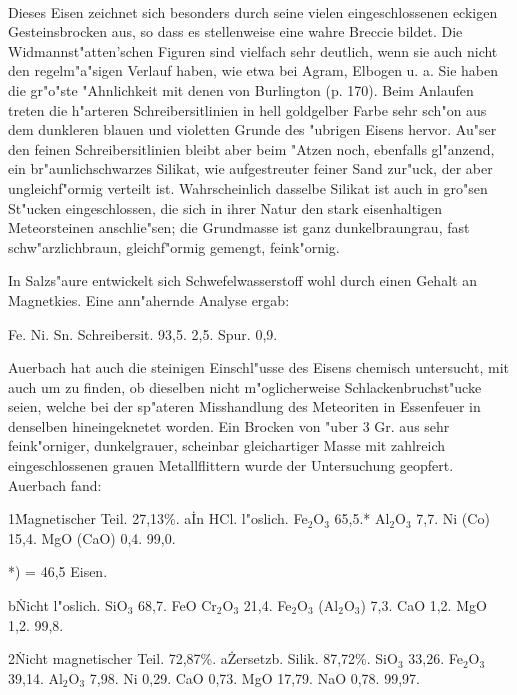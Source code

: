 \documentclass[a4paper, 11pt, oneside]{article}
\begin{document}
\paragraph{}
Dieses Eisen zeichnet sich besonders durch seine vielen eingeschlossenen eckigen Gesteinsbrocken aus, so dass es stellenweise eine wahre Breccie bildet. Die Widmannst"atten'schen Figuren sind vielfach sehr deutlich, wenn sie auch nicht den regelm"a"sigen Verlauf haben, wie etwa bei Agram, Elbogen u. a. Sie haben die gr"o"ste "Ahnlichkeit mit denen von Burlington (p. 170). Beim Anlaufen treten die h"arteren Schreibersitlinien in hell goldgelber Farbe sehr sch"on aus dem dunkleren blauen und violetten Grunde des "ubrigen Eisens hervor. Au"ser den feinen Schreibersitlinien bleibt aber beim "Atzen noch, ebenfalls gl"anzend, ein br"aunlichschwarzes Silikat, wie aufgestreuter feiner Sand zur"uck, der aber ungleichf"ormig verteilt ist. Wahrscheinlich dasselbe Silikat ist auch in gro"sen St"ucken eingeschlossen, die sich in ihrer Natur den stark eisenhaltigen Meteorsteinen anschlie"sen; die Grundmasse ist ganz dunkelbraungrau, fast schw"arzlichbraun, gleichf"ormig gemengt, feink"ornig.

In Salzs"aure entwickelt sich Schwefelwasserstoff wohl durch einen Gehalt an Magnetkies. Eine ann"ahernde Analyse ergab:

Fe. Ni. Sn. Schreibersit.  
93,5. 2,5. Spur. 0,9.

Auerbach hat auch die steinigen Einschl"usse des Eisens chemisch untersucht, mit auch um zu finden, ob dieselben nicht m"oglicherweise Schlackenbruchst"ucke seien, welche bei der sp"ateren Misshandlung des Meteoriten in Essenfeuer in denselben hineingeknetet worden. Ein Brocken von "uber 3 Gr. aus sehr feink"orniger, dunkelgrauer, scheinbar gleichartiger Masse mit zahlreich eingeschlossenen grauen Metallflittern wurde der Untersuchung geopfert. Auerbach fand:

1\. Magnetischer Teil. 27,13\%.  
a\. In HCl. l"oslich.  
Fe$_{2}$O$_{3}$ 65,5.*  
Al$_{2}$O$_{3}$ 7,7.  
Ni (Co) 15,4.  
MgO (CaO) 0,4.  
99,0.

*) = 46,5 Eisen.

b\. Nicht l"oslich.  
SiO$_{3}$ 68,7.  
FeO Cr$_{2}$O$_{3}$ 21,4.  
Fe$_{2}$O$_{3}$ (Al$_{2}$O$_{3}$) 7,3.  
CaO 1,2.  
MgO 1,2.  
99,8.

2\. Nicht magnetischer Teil. 72,87\%.
a\. Zersetzb. Silik. 87,72\%.
SiO$_{3}$ 33,26.
Fe$_{2}$O$_{3}$ 39,14.
Al$_{2}$O$_{3}$ 7,98.
Ni 0,29.
CaO 0,73.
MgO 17,79.
NaO 0,78.
99,97.
\end{document}
